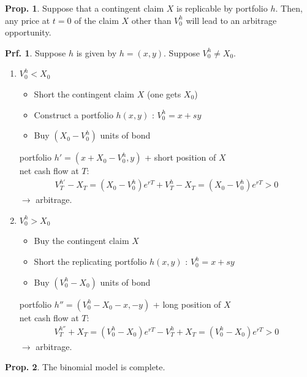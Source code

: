 \documentclass[a4paper,11pt]{jsarticle}
\theoremstyle{definition}
\newtheorem{prf}{Prf.}[subsection]
\newtheorem{prop}{Prop.}[subsection]
\begin{document}
\begin{prop}\label{prop_unique}
  Suppose that a contingent claim $X$ is replicable by
  portfolio $h$. Then, any price at $t=0$ of the claim $X$
  other than $V_0^h$ will lead to an arbitrage opportunity.
\end{prop}

\begin{prf}
  Suppose $h$ is given by $h=(x,y)$. Suppose $V_0^h\neq X_0$.
  \begin{enumerate}
    \item $V_0^h<X_0$
    \begin{itemize}
      \item Short the contingent claim $X$ (one gets $X_0$)
      \item Construct a portfolio $h(x,y)$ : $V_0^h=x+sy$
      \item Buy $(X_0-V_0^h)$ units of bond 
    \end{itemize}
    portfolio $h'=(x+X_0-V_0^h, y)$ + short position of $X$ \\
    net cash flow at $T$:
    \begin{align}
      V_T^{h'}-X_T=(X_0-V_0^h)e^{rT}+V_T^h -X_T
      =(X_0-V_0^h)e^{rT} > 0
    \end{align}  
    $\rightarrow$ arbitrage.
    \item $V_0^h>X_0$
    \begin{itemize}
      \item Buy the contingent claim $X$
      \item Short the replicating portfolio $h(x,y)$
      : $V_0^h=x+sy$
      \item Buy $(V_0^h-X_0)$ units of bond 
    \end{itemize}
    portfolio $h''=(V_0^h-X_0-x, -y)$ + long position of $X$ \\
    net cash flow at $T$:
    \begin{align}
      V_T^{h''}+X_T=(V_0^h-X_0)e^{rT}-V_T^h +X_T
      =(V_0^h-X_0)e^{rT} > 0
    \end{align}  
    $\rightarrow$ arbitrage.
  \end{enumerate}
\end{prf}


\begin{prop}
  The binomial model is complete.
\end{prop}
\end{document}
